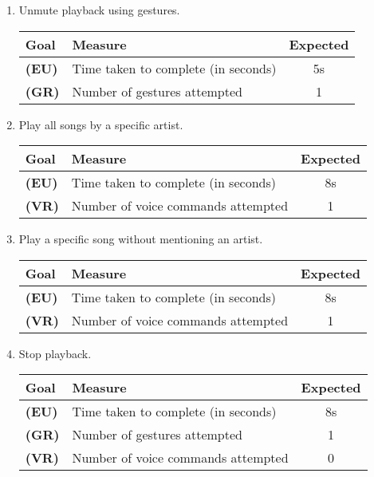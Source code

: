 \documentclass[12pt,letterpaper]{article}
\begin{document}
\begin{enumerate}
\item Unmute playback using gestures.
\begin{center}\begin{tabular}{l|l|c}
\textbf{Goal} & \textbf{Measure} & \textbf{Expected} \\
\hline
\textbf{(EU)} & Time taken to complete (in seconds) & 5s \\
\hline
\textbf{(GR)} & Number of gestures attempted & 1 \\
\hline
\end{tabular}\end{center}

\item Play all songs by a specific artist.
\begin{center}\begin{tabular}{l|l|c}
\textbf{Goal} & \textbf{Measure} & \textbf{Expected} \\
\hline
\textbf{(EU)} & Time taken to complete (in seconds) & 8s \\
\hline
\textbf{(VR)} & Number of voice commands attempted & 1 \\
\hline
\end{tabular}\end{center}

\item Play a specific song without mentioning an artist.
\begin{center}\begin{tabular}{l|l|c}
\textbf{Goal} & \textbf{Measure} & \textbf{Expected} \\
\hline
\textbf{(EU)} & Time taken to complete (in seconds) & 8s \\
\hline
\textbf{(VR)} & Number of voice commands attempted & 1 \\
\hline
\end{tabular}\end{center}

\item Stop playback.
\begin{center}\begin{tabular}{l|l|c}
\textbf{Goal} & \textbf{Measure} & \textbf{Expected} \\
\hline
\textbf{(EU)} & Time taken to complete (in seconds) & 8s \\
\hline
\textbf{(GR)} & Number of gestures attempted & 1 \\
\hline
\textbf{(VR)} & Number of voice commands attempted & 0 \\
\hline
\end{tabular}\end{center}

\end{enumerate}
\end{document}

